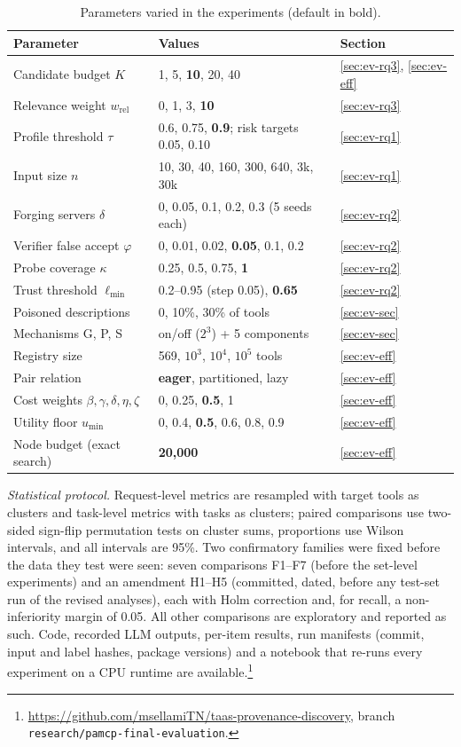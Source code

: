 \begin{table}[t]
\centering
\caption{Parameters varied in the experiments (default in bold).}
\label{tab:ev-params}
\scriptsize
\setlength{\tabcolsep}{2.5pt}
\begin{tabular}{@{}lp{4.2cm}l@{}}
\toprule
Parameter & Values & Section \\
\midrule
Candidate budget $K$ & 1, 5, \textbf{10}, 20, 40 & \ref{sec:ev-rq3}, \ref{sec:ev-eff} \\
Relevance weight $w_{\mathrm{rel}}$ & 0, 1, 3, \textbf{10} & \ref{sec:ev-rq3} \\
Profile threshold $\tau$ & 0.6, 0.75, \textbf{0.9}; risk targets 0.05, 0.10 & \ref{sec:ev-rq1} \\
Input size $n$ & 10, 30, 40, 160, 300, 640, 3k, 30k & \ref{sec:ev-rq1} \\
Forging servers $\delta$ & 0, 0.05, 0.1, 0.2, 0.3 (5 seeds each) & \ref{sec:ev-rq2} \\
Verifier false accept $\varphi$ & 0, 0.01, 0.02, \textbf{0.05}, 0.1, 0.2 & \ref{sec:ev-rq2} \\
Probe coverage $\kappa$ & 0.25, 0.5, 0.75, \textbf{1} & \ref{sec:ev-rq2} \\
Trust threshold $\ell_{\min}$ & 0.2--0.95 (step 0.05), \textbf{0.65} & \ref{sec:ev-rq2} \\
Poisoned descriptions & 0, 10\%, 30\% of tools & \ref{sec:ev-sec} \\
Mechanisms G, P, S & on/off ($2^3$) + 5 components & \ref{sec:ev-sec} \\
Registry size & 569, $10^3$, $10^4$, $10^5$ tools & \ref{sec:ev-eff} \\
Pair relation & \textbf{eager}, partitioned, lazy & \ref{sec:ev-eff} \\
Cost weights $\beta,\gamma,\delta,\eta,\zeta$ & 0, 0.25, \textbf{0.5}, 1 & \ref{sec:ev-eff} \\
Utility floor $u_{\min}$ & 0, 0.4, \textbf{0.5}, 0.6, 0.8, 0.9 & \ref{sec:ev-eff} \\
Node budget (exact search) & \textbf{20,000} & \ref{sec:ev-eff} \\
\bottomrule
\end{tabular}
\end{table}

\emph{Statistical protocol.} Request-level metrics are resampled with target tools as clusters and task-level
metrics with tasks as clusters; paired comparisons use two-sided sign-flip permutation tests on cluster sums,
proportions use Wilson intervals, and all intervals are 95\%. Two confirmatory families were fixed before the
data they test were seen: seven comparisons F1--F7 (before the set-level experiments) and an amendment H1--H5
(committed, dated, before any test-set run of the revised analyses), each with Holm correction and, for recall, a
non-inferiority margin of 0.05. All other comparisons are exploratory and reported as such. Code, recorded LLM
outputs, per-item results, run manifests (commit, input and label hashes, package versions) and a notebook that
re-runs every experiment on a CPU runtime are
available.\footnote{\url{https://github.com/msellamiTN/taas-provenance-discovery}, branch
\texttt{research/pamcp-final-evaluation}.}
